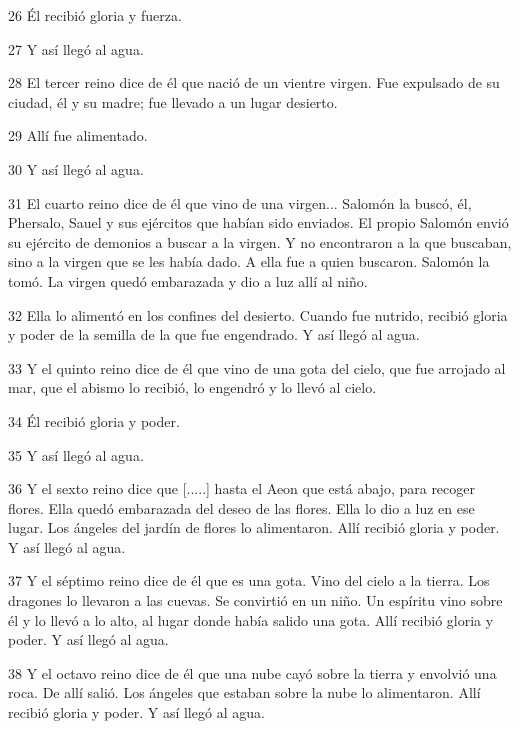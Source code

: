 \par 26 Él recibió gloria y fuerza.
\par 27 Y así llegó al agua.
\par 28 El tercer reino dice de él que nació de un vientre virgen. Fue expulsado de su ciudad, él y su madre; fue llevado a un lugar desierto.

\par 29 Allí fue alimentado.
\par 30 Y así llegó al agua.
\par 31 El cuarto reino dice de él que vino de una virgen... Salomón la buscó, él, Phersalo, Sauel y sus ejércitos que habían sido enviados. El propio Salomón envió su ejército de demonios a buscar a la virgen. Y no encontraron a la que buscaban, sino a la virgen que se les había dado. A ella fue a quien buscaron. Salomón la tomó. La virgen quedó embarazada y dio a luz allí al niño.

\par 32 Ella lo alimentó en los confines del desierto. Cuando fue nutrido, recibió gloria y poder de la semilla de la que fue engendrado. Y así llegó al agua.

\par 33 Y el quinto reino dice de él que vino de una gota del cielo, que fue arrojado al mar, que el abismo lo recibió, lo engendró y lo llevó al cielo.
\par 34 Él recibió gloria y poder.
\par 35 Y así llegó al agua.
\par 36 Y el sexto reino dice que [.....] hasta el Aeon que está abajo, para recoger flores. Ella quedó embarazada del deseo de las flores. Ella lo dio a luz en ese lugar. Los ángeles del jardín de flores lo alimentaron. Allí recibió gloria y poder. Y así llegó al agua.

\par 37 Y el séptimo reino dice de él que es una gota. Vino del cielo a la tierra. Los dragones lo llevaron a las cuevas. Se convirtió en un niño. Un espíritu vino sobre él y lo llevó a lo alto, al lugar donde había salido una gota. Allí recibió gloria y poder. Y así llegó al agua.

\par 38 Y el octavo reino dice de él que una nube cayó sobre la tierra y envolvió una roca. De allí salió. Los ángeles que estaban sobre la nube lo alimentaron. Allí recibió gloria y poder. Y así llegó al agua.

